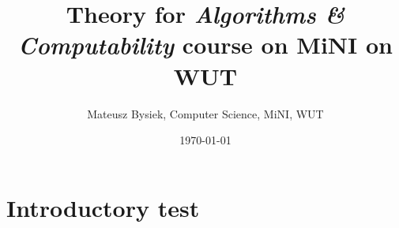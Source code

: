 \documentclass{article}
\begin{document}
\title{Theory for \emph{Algorithms \& Computability} course on MiNI on WUT}
\date{\today}
\author{Mateusz Bysiek, Computer Science, MiNI, WUT}
\maketitle

\tableofcontents

\pagebreak[4]


\section{Introductory test}

\end{document}
